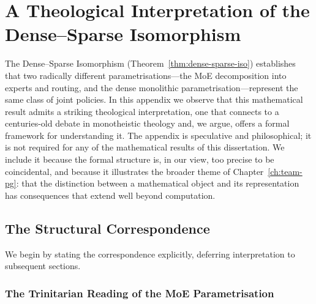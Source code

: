 
\chapter{A Theological Interpretation of the Dense--Sparse Isomorphism}
\label{app:theology}

The Dense--Sparse Isomorphism (Theorem~\ref{thm:dense-sparse-iso}) establishes that two radically different parametrisations---the MoE decomposition into experts and routing, and the dense monolithic parametrisation---represent the same class of joint policies. In this appendix we observe that this mathematical result admits a striking theological interpretation, one that connects to a centuries-old debate in monotheistic theology and, we argue, offers a formal framework for understanding it. The appendix is speculative and philosophical; it is not required for any of the mathematical results of this dissertation. We include it because the formal structure is, in our view, too precise to be coincidental, and because it illustrates the broader theme of Chapter~\ref{ch:team-pg}: that the distinction between a mathematical object and its representation has consequences that extend well beyond computation.

\section{The Structural Correspondence}
\label{sec:structural-correspondence}

We begin by stating the correspondence explicitly, deferring interpretation to subsequent sections.

\subsection{The Trinitarian Reading of the MoE Parametrisation}
\label{subsec:trinity-moe}

